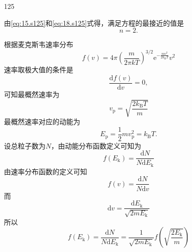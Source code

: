 \begin{solution}{125}
\begin{subsolution}
\begin{equation}
            \label{eq:18.s125}
        \end{equation}
        由\eqref{eq:15.s125}和\eqref{eq:18.s125}式得，满足方程的最接近的值是
        \begin{equation}
            n = 2.
            \label{eq:19.s125}
        \end{equation}
    \end{subsolution}
    \begin{subsolution}
        根据麦克斯韦速率分布
        \begin{equation}
            f (v) = 4 \pi \left(\frac {m}{2 \pi k T}\right) ^ {3 / 2} \mathrm{e} ^ {- \frac {m v ^ {2}}{2 k _ {\mathrm{B}} T}} v ^ {2}
            \label{eq:20.s125}
        \end{equation}
        速率取极大值的条件是
        \begin{equation}
            \frac {\mathrm{d} f (v)}{\mathrm{d} v} = 0,
            \label{eq:21.s125}
        \end{equation}
        可知最概然速率为
        \begin{equation}
            v _ {\mathrm{p}} = \sqrt {\frac {2 k _ {\mathrm{B}} T}{m}}
            \label{eq:22.s125}
        \end{equation}
        最概然速率对应的动能为
        \begin{equation}
            E _ {\mathrm{p}} = \frac {1}{2} m v _ {\mathrm{p}} ^ {2} = k _ {\mathrm{B}} T.
            \label{eq:23.s125}
        \end{equation}
        设总粒子数为$N$，由动能分布函数定义可知为
        \begin{equation}
            f \left(E _ {\mathrm{k}}\right) = \frac {\mathrm{d} N}{N \mathrm{d} E _ {\mathrm{k}}}
            \label{eq:24.s125}
        \end{equation}
        由速率分布函数的定义可知
        \begin{equation}
            f (v) = \frac {\mathrm{d} N}{N \mathrm{d} v}
            \label{eq:25.s125}
        \end{equation}
        而
        \begin{equation}
            \mathrm{d} v = \frac {\mathrm{d} E _ {\mathrm{k}}}{\sqrt {2 m E _ {\mathrm{k}}}}
            \label{eq:26.s125}
        \end{equation}
        所以
        \begin{equation}
            f \left(E _ {\mathrm{k}}\right) = \frac {\mathrm{d} N}{N \mathrm{d} E _ {\mathrm{k}}} = \frac {1}{\sqrt {2 m E _ {\mathrm{k}}}} f \left(\sqrt {\frac {2 E _ {\mathrm{k}}}{m}}\right)

\end{equation}
\end{subsolution}
\end{solution}
